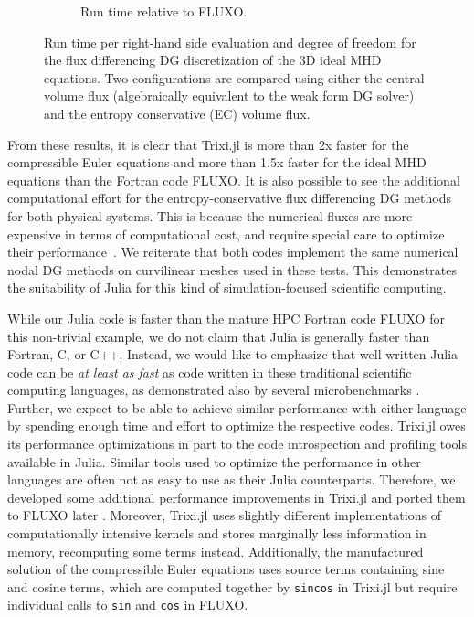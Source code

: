 \documentclass[hidelinks]{juliacon} %
\newcommand{\trixi}{Trixi.jl\xspace}
\begin{document}
\begin{figure}[!ht]
\begin{subfigure}{\linewidth}
    \caption{Run time relative to FLUXO.}
  \end{subfigure}%
  \caption{Run time per right-hand side evaluation and degree of freedom for
           the flux differencing DG discretization of the 3D ideal MHD equations.
           Two configurations are compared using either the central volume flux
           (algebraically equivalent to the weak form DG solver) and the entropy
           conservative (EC) volume flux.}
  \label{fig:PID-MHD}
\end{figure}

From these results, it is clear that \trixi is more than 2x faster for the compressible Euler equations
and more than 1.5x faster for the ideal MHD equations than the Fortran code FLUXO.
It is also possible to see the additional computational effort for the entropy-conservative flux
differencing DG methods for both physical systems. This is because the numerical fluxes are more
expensive in
terms of computational cost, and require special care to optimize their performance~\cite{hendrik_blog,ranocha2021efficient}.
We reiterate that both codes implement the same numerical nodal DG methods on curvilinear meshes used in these tests.
This demonstrates the suitability of Julia for this kind of simulation-focused scientific computing.

While our Julia code is faster than the mature HPC Fortran code FLUXO for this non-trivial
example, we do not claim that Julia is generally faster than Fortran, C, or C++.
Instead, we would like to emphasize that well-written Julia code can be \emph{at least
as fast} as code written in these traditional scientific computing languages,
as demonstrated also by several microbenchmarks \cite{bezanson2017julia}.
Further, we expect to be able to achieve similar performance with either language
by spending enough time and effort to optimize the respective codes.
\trixi owes its performance optimizations in part to the code introspection and
profiling tools available in Julia. Similar tools used to optimize the performance in other
languages are often not as easy to use as their Julia counterparts. Therefore,
we developed some additional performance improvements in \trixi and ported them
to FLUXO later \cite{ranocha2021efficient}. Moreover, \trixi uses slightly
different implementations of computationally intensive kernels and stores marginally
less information in memory, recomputing some terms instead. Additionally, the
manufactured solution of the compressible Euler equations uses source terms
containing sine and cosine terms, which are computed together by \lstinline{sincos}
in \trixi but require individual calls to \lstinline{sin} and \lstinline{cos} in
FLUXO.
\end{document}
